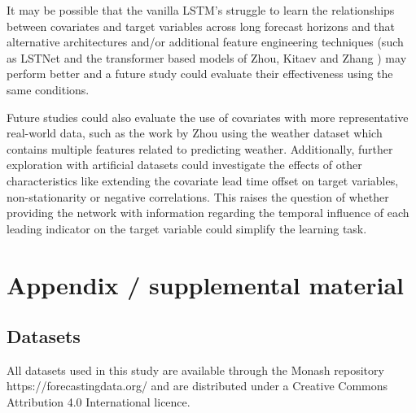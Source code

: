 \documentclass{article}
\begin{document}
It may be possible that the vanilla LSTM's struggle to learn the relationships between covariates and target variables 
across long forecast horizons and that alternative architectures and/or additional feature engineering techniques (such as LSTNet \cite{lai2018modeling} and the transformer based models
 of Zhou, Kitaev and Zhang \cite{zhou2021informer,kitaev2020reformer,zhang2023crossformer}) may perform better and a future study could evaluate their effectiveness using the same conditions. 

Future studies could also evaluate the use of covariates with more representative 
real-world data, such as the work by Zhou \cite{zhou2021informer} using the weather dataset which contains multiple features related to predicting weather. 
Additionally, further exploration with artificial datasets could investigate the effects of other characteristics like 
extending the covariate lead time offset on target variables, non-stationarity or negative correlations. This raises the question of whether providing 
the network with information regarding the temporal influence of each leading indicator on the target variable could simplify the learning task.




\FloatBarrier
\newpage
\appendix
\section{Appendix / supplemental material}
\subsection{Datasets}
All datasets used in this study are available through the Monash repository https://forecastingdata.org/ 
and are distributed under a Creative Commons Attribution 4.0 International licence.
\end{document}
